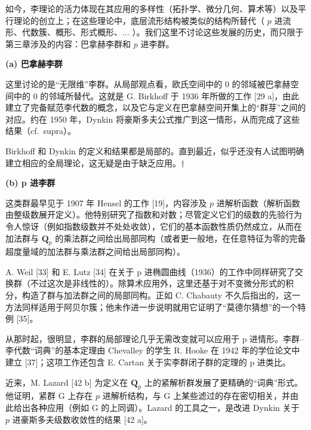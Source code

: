 
如今，李理论的活力体现在其应用的多样性（拓扑学、微分几何、算术等）以及平行理论的创立上；在这些理论中，底层流形结构被类似的结构所替代（ \(p\) 进流形、代数簇、概形、形式概形、\(\ldots\) ）。我们这里不讨论这些发展的历史，而只限于第三章涉及的内容：巴拿赫李群和 \(p\) 进李群。

\textbf{(a) 巴拿赫李群}

这里讨论的是“无限维”李群。从局部观点看，欧氏空间中的 0 的邻域被巴拿赫空间中的 0 的邻域所替代。这就是 G. Birkhoff 于 1936 年所做的工作 {[}29 a{]}，由此建立了完备赋范李代数的概念，以及它与定义在巴拿赫空间开集上的“群芽”之间的对应。约在 1950 年，Dynkin 将豪斯多夫公式推广到这一情形，从而完成了这些结果（cf.~supra）。

Birkhoff 和 Dynkin 的定义和结果都是局部的。直到最近，似乎还没有人试图明确建立相应的全局理论，这无疑是由于缺乏应用。†

\textbf{(b) p 进李群}

这类群最早见于 1907 年 Hensel 的工作 {[}19{]}，内容涉及 \(p\) 进解析函数（解析函数由整级数展开定义）。他特别研究了指数和对数；尽管定义它们的级数的先验行为令人惊讶（例如指数级数并不处处收敛），它们的基本函数性质仍然成立，从而在加法群与 \(\mathbf{Q}_p\) 的乘法群之间给出局部同构（或者更一般地，在任意特征为零的完备超度量域的加法群与乘法群之间给出局部同构）。

A. Weil {[}33{]} 和 E. Lutz {[}34{]} 在关于 p 进椭圆曲线（1936）的工作中同样研究了交换群（不过这次是非线性的）。除算术应用外，这里还基于对不变微分形式的积分，构造了群与加法群之间的局部同构。正如 C. Chabauty 不久后指出的，这一方法同样适用于阿贝尔簇；他未作进一步说明就用它证明了“莫德尔猜想”的一个特例 {[}35{]}。

从那时起，很明显，李群的局部理论几乎无需改变就可以应用于 p 进情形。李群--李代数“词典”的基本定理由 Chevalley 的学生 R. Hooke 在 1942 年的学位论文中建立 {[}37{]}；这项工作还包含 E. Cartan 关于实李群闭子群的定理的 p 进类比。

近来，M. Lazard {[}42 b{]} 为定义在 \(\mathbf{Q}_{\mathrm{p}}\) 上的紧解析群发展了更精确的“词典”形式。他证明，紧群 G 上存在 \(p\) 进解析结构，与 G 上某些滤过的存在密切相关，并由此给出各种应用（例如 G 的上同调）。Lazard 的工具之一，是改进 Dynkin 关于 \(p\) 进豪斯多夫级数收敛性的结果 {[}42 a{]}。

